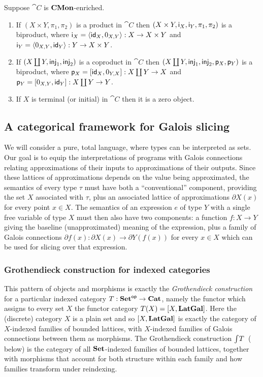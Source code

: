 \begin{proposition}
\label{prop:biproducts:from-product-or-coproduct}
Suppose $\cat{C}$ is $\mathbf{CMon}$-enriched.
\begin{enumerate}
\item If $(X \times Y, \pi_1, \pi_2)$ is a product in $\cat{C}$ then $(X \times Y, \mathsf{i}_X, \mathsf{i}_Y, \pi_1, \pi_2)$
is a biproduct, where $\mathsf{i}_X = \langle \mathsf{id}_X, 0_{X,Y}\rangle: X \to X \times Y$ and $\mathsf{i}_Y =
\langle 0_{X,Y}, \mathsf{id}_Y\rangle: Y \to X \times Y$.
\item If $(X \coprod Y, \mathsf{inj}_1, \mathsf{inj}_2)$ is a coproduct in $\cat{C}$ then $(X \coprod Y, \mathsf{inj}_1, \mathsf{inj}_2,
\mathsf{p}_X, \mathsf{p}_Y)$ is a biproduct, where $\mathsf{p}_X = [\mathsf{id}_X, 0_{Y,X}]: X \coprod Y \to X$ and
$\mathsf{p}_Y = [0_{X,Y}, \mathsf{id}_Y]: X \coprod Y \to Y$.
\item If $X$ is terminal (or initial) in $\cat{C}$ then it is a zero object.
\end{enumerate}
\end{proposition}

\subsection{A categorical framework for Galois slicing}

We will consider a pure, total language, where types can be interpreted as sets. Our goal is to equip the
interpretations of programs with Galois connections relating approximations of their inputs to approximations
of their outputs. Since these lattices of approximations depends on the value being approximated, the
semantics of every type $\tau$ must have both a ``conventional'' component, providing the set $X$ associated
with $\tau$, plus an associated lattice of approximations $\partial X(x)$ for every point $x \in X$. The
semantics of an expression $e$ of type $Y$ with a single free variable of type $X$ must then also have two
components: a function $f: X \to Y$ giving the baseline (unapproximated) meaning of the expression, plus a
family of Galois connections $\partial f(x): \partial X(x) \to \partial Y(f(x))$ for every $x \in X$ which can
be used for slicing over that expression.

\subsubsection{Grothendieck construction for indexed categories}
\label{sec:Grothendieck}

This pattern of objects and morphisms is exactly the \emph{Grothendieck construction} for a particular indexed
category $T: \mathbf{Set}^{\mathsf{op}} \to \mathbf{Cat}$, namely the functor which assigns to every set $X$ the functor category $T(X)
= [X,\mathbf{LatGal}]$. Here the (discrete) category $X$ is a plain set and so $[X,\mathbf{LatGal}]$ is exactly
the category of $X$-indexed families of bounded lattices, with $X$-indexed families of Galois connections
between them as morphisms. The Grothendieck construction $\int_{}T$~( below) is
the category of all $\mathbf{Set}$-indexed families of bounded lattices, together with morphisms that account for both
structure within each family and how families transform under reindexing.

